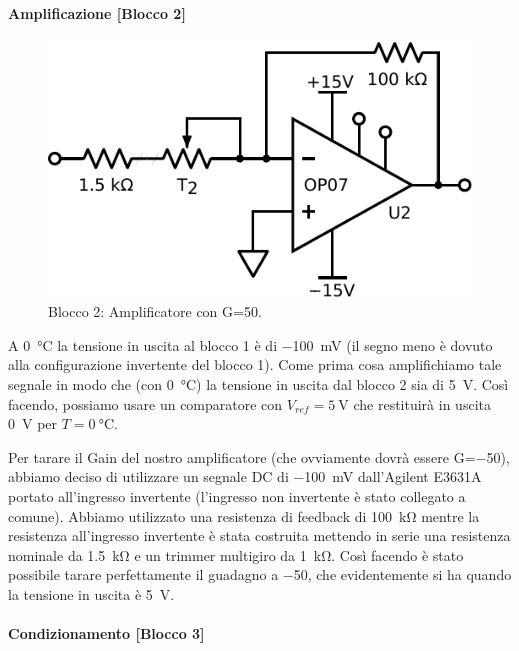 \paragraph{Amplificazione [Blocco 2]\newline}

\begin{figure}
\centering
\includegraphics[width=.3\textwidth]{../E06/latex/P2.pdf}
\caption{Blocco 2: Amplificatore con G=50.}
\label{cir6:blocco2}
\end{figure}

A \SI{0}{\celsius} la tensione in uscita al blocco 1 è di \SI{-100}{\mV} (il segno meno è dovuto alla configurazione invertente del blocco 1).
Come prima cosa amplifichiamo tale segnale in modo che (con \SI{0}{\celsius}) la tensione in uscita dal blocco 2 sia di \SI{5}{\volt}.
Così facendo, possiamo usare un comparatore con $V_{ref}=\SI{5}{\volt}$ che restituirà in uscita \SI{0}{\volt} per $T=\SI{0}{\celsius}$.

Per tarare il Gain del nostro amplificatore (che ovviamente dovrà essere G=\num{-50}), abbiamo deciso di utilizzare un segnale DC di \SI{-100}{\mV} dall'Agilent E3631A portato all'ingresso invertente (l'ingresso non invertente è stato collegato a comune).
Abbiamo utilizzato una resistenza di feedback di \SI{100}{\kilo\ohm} mentre la resistenza all'ingresso invertente è stata costruita mettendo in serie una resistenza nominale da \SI{1.5}{\kilo\ohm} e un trimmer multigiro da \SI{1}{\kilo\ohm}.
Così facendo è stato possibile tarare perfettamente il guadagno a \num{-50}, che evidentemente si ha quando la tensione in uscita è \SI{5}{\volt}. 

\paragraph{Condizionamento [Blocco 3]\newline}

